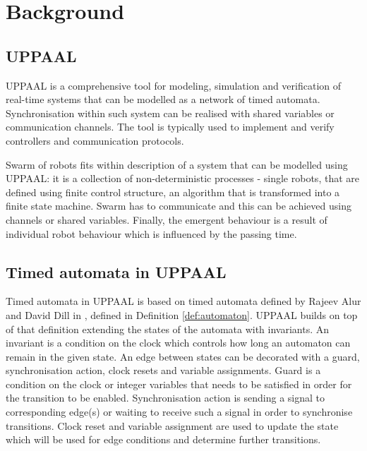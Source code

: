 \section{Background}

\subsection{UPPAAL}
UPPAAL \cite{UPPAAL_in_a_Nutshell} is a comprehensive tool for modeling, simulation and verification of real-time systems that can be modelled as a network of timed automata. Synchronisation within such system can be realised with shared variables or communication channels. The tool is typically used to implement and verify controllers and communication protocols.

Swarm of robots fits within description of a system that can be modelled using UPPAAL: it is a collection of non-deterministic processes - single robots, that are defined using finite control structure, an algorithm that is transformed into a finite state machine. Swarm has to communicate and this can be achieved using channels or shared variables. Finally, the emergent behaviour is a result of individual robot behaviour which is influenced by the passing time.


\subsection{Timed automata in UPPAAL}
Timed automata in UPPAAL is based on timed automata defined by Rajeev Alur and David Dill in \cite{Automata_For_Modeling_Real-Time_Systems}, defined in Definition \ref{def:automaton}. UPPAAL builds on top of that definition extending the states of the automata with invariants. An invariant is a condition on the clock which controls how long an automaton can remain in the given state. An edge between states can be decorated with a guard, synchronisation action, clock resets and variable assignments. Guard is a condition on the clock or integer variables that needs to be satisfied in order for the transition to be enabled. Synchronisation action is sending a signal to corresponding edge(s) or waiting to receive such a signal in order to synchronise transitions. Clock reset and variable assignment are used to update the state which will be used for edge conditions and determine further transitions. \cite{UPPAAL_in_a_Nutshell}

